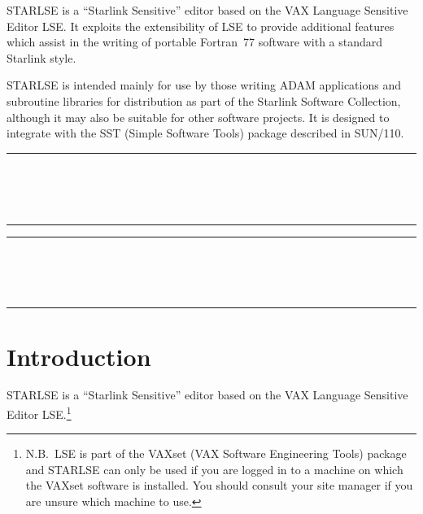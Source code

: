\mbox{STARLSE} is a ``Starlink Sensitive'' editor based on the \mbox{VAX}
Language Sensitive Editor \mbox{LSE}. It exploits the extensibility of
\mbox{LSE} to provide additional features which assist in the writing of
portable Fortran~77 software with a standard Starlink style.

\mbox{STARLSE} is intended mainly for use by those writing \mbox{ADAM}
applications and subroutine libraries for distribution as part of the Starlink
Software Collection, although it may also be suitable for other software
projects. It is designed to integrate with the SST (Simple Software Tools)
package described in SUN/110.

\newpage
\markright{\stardocname}
\null\vspace {5mm}
\begin {center}
\rule{80mm}{0.5mm} \\ [1ex]
{\Large\bf \stardoctitle \\ [2.5ex]
           \stardocversion} \\ [2ex]
\rule{80mm}{0.5mm}
\end{center}

\setlength{\parskip}{0mm}
\tableofcontents
\setlength{\parskip}{\medskipamount}

\newpage
\markright{\stardocname}
\renewcommand{\thepage}{\arabic{page}}
\setcounter{page}{1}

\null\vspace {5mm}
\begin {center}
\rule{80mm}{0.5mm} \\ [1ex]
{\Large\bf \stardoctitle \\ [2.5ex]
           \stardocversion} \\ [2ex]
\rule{80mm}{0.5mm}
\end{center}
\vspace{30mm}

\section{Introduction}

\mbox{STARLSE} is a ``Starlink Sensitive'' editor based on the \mbox{VAX}
Language Sensitive Editor \mbox{LSE}.\footnote{N.B.\ \mbox{LSE} is part of
the \mbox{VAXset} (\mbox{VAX} Software Engineering Tools) package and
\mbox{STARLSE} can only be used if you are logged in to a machine on which
the \mbox{VAXset} software is installed. You should consult your site
manager if you are unsure which machine to use.}

